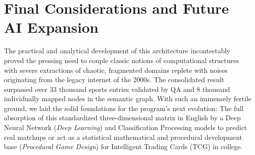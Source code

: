 \documentclass[12pt,a4paper]{article}
\begin{document}
\section{Final Considerations and Future AI Expansion}
The practical and analytical development of this architecture incontestably proved the pressing need to couple classic notions of computational structures with severe extractions of chaotic, fragmented domains replete with noises originating from the legacy internet of the 2000s.
The consolidated result surpassed over 33 thousand sports entries validated by QA and 8 thousand individually mapped nodes in the semantic graph.
With such an immensely fertile ground, we laid the solid foundations for the program's next evolution: The full absorption of this standardized three-dimensional matrix in English by a Deep Neural Network (\textit{Deep Learning}) and Classification Processing models to predict real matchups or act as a statistical mathematical and procedural development base (\textit{Procedural Game Design}) for Intelligent Trading Cards (TCG) in college.
\end{document}
